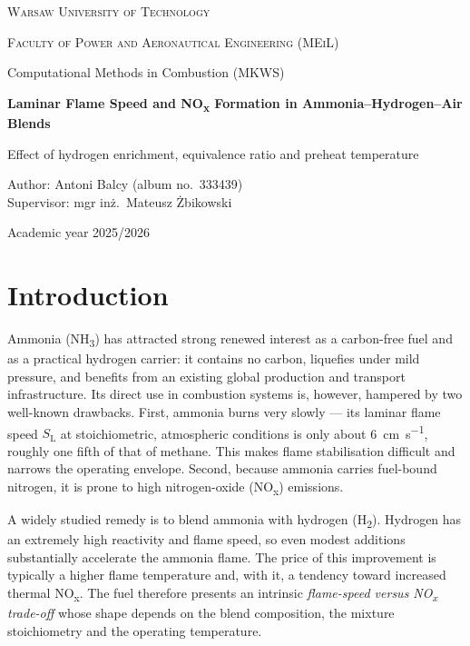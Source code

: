 \documentclass[12pt,a4paper]{article}
\newcommand{\NHH}{NH\textsubscript{3}}
\newcommand{\HH}{H\textsubscript{2}}
\newcommand{\NOx}{NO\textsubscript{x}}
\newcommand{\SL}{$S_\mathrm{L}$}
\begin{document}
\begin{titlepage}
\centering
\vspace*{1.5cm}
{\scshape\large Warsaw University of Technology\par}
{\scshape Faculty of Power and Aeronautical Engineering (MEiL)\par}
\vspace{0.5cm}
{\large Computational Methods in Combustion (MKWS)\par}
\vfill
{\Huge\bfseries Laminar Flame Speed and \NOx{} Formation in Ammonia--Hydrogen--Air Blends\par}
\vspace{0.8cm}
{\large Effect of hydrogen enrichment, equivalence ratio and preheat temperature\par}
\vfill
\begin{flushright}
\large
Author: Antoni Balcy (album no.\ 333439)\\[0.2cm]
Supervisor: mgr inż.\ Mateusz Żbikowski\\[0.2cm]
\end{flushright}
\vspace{1cm}
{\large Academic year 2025/2026\par}
\end{titlepage}

\tableofcontents
\newpage

\section{Introduction}

Ammonia (\NHH) has attracted strong renewed interest as a carbon-free fuel and
as a practical hydrogen carrier: it contains no carbon, liquefies under mild
pressure, and benefits from an existing global production and transport
infrastructure. Its direct use in combustion systems is, however, hampered by
two well-known drawbacks. First, ammonia burns very slowly --- its laminar
flame speed \SL{} at stoichiometric, atmospheric conditions is only about
\SI{6}{\centi\meter\per\second}, roughly one fifth of that of methane. This
makes flame stabilisation difficult and narrows the operating envelope.
Second, because ammonia carries fuel-bound nitrogen, it is prone to high
nitrogen-oxide (\NOx{}) emissions.

A widely studied remedy is to blend ammonia with hydrogen (\HH). Hydrogen has
an extremely high reactivity and flame speed, so even modest additions
substantially accelerate the ammonia flame. The price of this improvement is
typically a higher flame temperature and, with it, a tendency toward increased
thermal \NOx{}. The fuel therefore presents an intrinsic
\emph{flame-speed versus \NOx{} trade-off} whose shape depends on the blend
composition, the mixture stoichiometry and the operating temperature.
\end{document}
